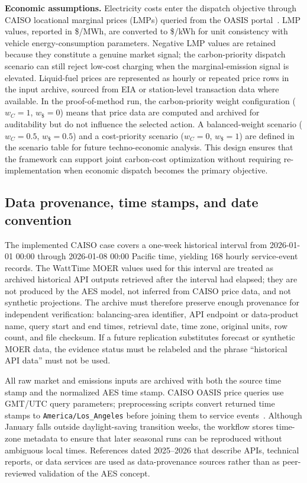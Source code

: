 \documentclass[cleantechnol,article,submit,pdftex,moreauthors]{Definitions/mdpi}
\begin{document}
\textbf{Economic assumptions.} Electricity costs enter the dispatch objective through CAISO locational marginal prices (LMPs) queried from the OASIS portal~\cite{CAISOOASISAPI,CAISOOASISFAQ}. LMP values, reported in \$/MWh, are converted to \$/kWh for unit consistency with vehicle energy-consumption parameters. Negative LMP values are retained because they constitute a genuine market signal; the carbon-priority dispatch scenario can still reject low-cost charging when the marginal-emission signal is elevated. Liquid-fuel prices are represented as hourly or repeated price rows in the input archive, sourced from EIA or station-level transaction data where available. In the proof-of-method run, the carbon-priority weight configuration ($w_C=1$, $w_\$=0$) means that price data are computed and archived for auditability but do not influence the selected action. A balanced-weight scenario ($w_C=0.5$, $w_\$=0.5$) and a cost-priority scenario ($w_C=0$, $w_\$=1$) are defined in the scenario table for future techno-economic analysis. This design ensures that the framework can support joint carbon-cost optimization without requiring re-implementation when economic dispatch becomes the primary objective.


\subsection{Data provenance, time stamps, and date convention}
\label{subsec:data_provenance}

The implemented CAISO case covers a one-week historical interval from 2026-01-01 00:00 through 2026-01-08 00:00 Pacific time, yielding 168 hourly service-event records. The WattTime MOER values used for this interval are treated as archived historical API outputs retrieved after the interval had elapsed; they are not produced by the AES model, not inferred from CAISO price data, and not synthetic projections. The archive must therefore preserve enough provenance for independent verification: balancing-area identifier, API endpoint or data-product name, query start and end times, retrieval date, time zone, original units, row count, and file checksum. If a future replication substitutes forecast or synthetic MOER data, the evidence status must be relabeled and the phrase ``historical API data'' must not be used.

All raw market and emissions inputs are archived with both the source time stamp and the normalized AES time stamp. CAISO OASIS price queries use GMT/UTC query parameters; preprocessing scripts convert returned time stamps to \texttt{America/Los\_Angeles} before joining them to service events~\cite{CAISOOASISAPI,CAISOOASISFAQ}. Although January falls outside daylight-saving transition weeks, the workflow stores time-zone metadata to ensure that later seasonal runs can be reproduced without ambiguous local times. References dated 2025--2026 that describe APIs, technical reports, or data services are used as data-provenance sources rather than as peer-reviewed validation of the AES concept.
\end{document}
